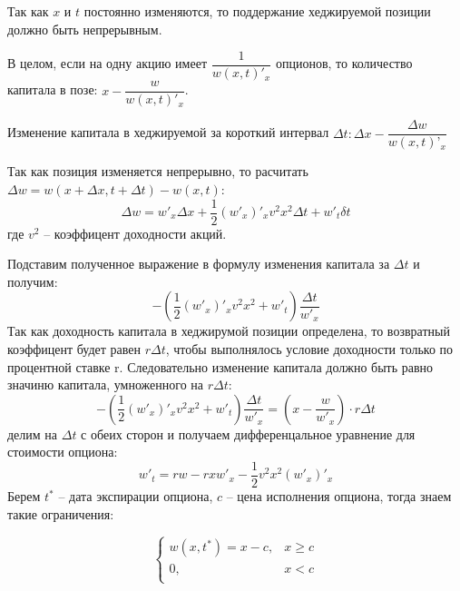 \documentclass[a4paper]{article}
\begin{document}
Так как $x$ и $t$ постоянно изменяются, то поддержание хеджируемой позиции должно быть непрерывным.


В целом, если на одну акцию имеет $\dfrac{1}{w(x, t)'_x}$ опционов, то количество капитала в позе: $x - \dfrac{w}{w(x, t)'_x}$.

Изменение капитала в хеджируемой за короткий интервал $\Delta t: \Delta x - \dfrac{\Delta w}{w(x, t)’_x}$

Так как позиция изменяется непрерывно, то расчитать $\Delta w = w(x + \Delta x, t + \Delta t) - w(x, t)$:
\[\Delta w = w'_x \Delta x + \frac{1}{2} (w'_x)'_x v^2 x^2 \Delta t + w'_t \delta t\]
где $v^2$ -- коэффицент доходности акций.

Подставим полученное выражение в формулу изменения капитала за $\Delta t$ и получим:
\[- \left(\dfrac{1}{2} (w'_x)'_x v^2 x^2 + w'_t \right) \dfrac{\Delta t}{w'_x}\]
Так как доходность капитала в хеджирумой позиции определена, то возвратный коэффицент будет равен $r \Delta t$, чтобы выполнялось условие доходности только по процентной ставке r. Следовательно изменение капитала должно быть равно значиню капитала, умноженного на $r \Delta t$:
\[- \left(\dfrac{1}{2} (w'_x)'_x v^2 x^2 + w'_t \right) \dfrac{\Delta t}{w'_x} = (x - \dfrac{w}{w'_x}) \cdot r \Delta t\]
делим на $\Delta t $ с обеих сторон и получаем дифференцальное уравнение для стоимости опциона:
\[w'_t = rw - rxw'_x - \dfrac{1}{2} v^2 x^2 (w'_x)'_x\]
Берем $t^*$ -- дата экспирации опциона, $c$ -- цена исполнения опциона, тогда знаем такие ограничения:

\begin{equation*}
    \begin{cases}
        w(x, t^*) = x - c, &x \geq c\\
        0, &x < c \\
    \end{cases}
\end{equation*}
\end{document}
